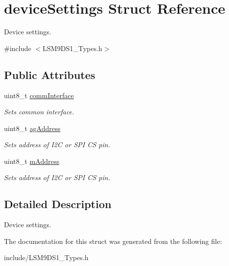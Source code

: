 \hypertarget{structdeviceSettings}{}\section{device\+Settings Struct Reference}
\label{structdeviceSettings}


Device settings.  




{\ttfamily \#include $<$L\+S\+M9\+D\+S1\+\_\+\+Types.\+h$>$}

\subsection*{Public Attributes}
\begin{DoxyCompactItemize}
\item 
\mbox{\label{structdeviceSettings_a6512c63d06cce5f99760b1b3a6a4dfe9}} 
uint8\+\_\+t \hyperlink{structdeviceSettings_a6512c63d06cce5f99760b1b3a6a4dfe9}{comm\+Interface}
\begin{DoxyCompactList}\small\item\em Sets common interface. \end{DoxyCompactList}\item 
\mbox{\label{structdeviceSettings_a2f43ac785e01fcbcfaf8436885f638ab}} 
uint8\+\_\+t \hyperlink{structdeviceSettings_a2f43ac785e01fcbcfaf8436885f638ab}{ag\+Address}
\begin{DoxyCompactList}\small\item\em Sets address of I2C or S\+PI CS pin. \end{DoxyCompactList}\item 
\mbox{\label{structdeviceSettings_aec4e1d3e3f38b4e3e0f74f1640e16faa}} 
uint8\+\_\+t \hyperlink{structdeviceSettings_aec4e1d3e3f38b4e3e0f74f1640e16faa}{m\+Address}
\begin{DoxyCompactList}\small\item\em Sets address of I2C or S\+PI CS pin. \end{DoxyCompactList}\end{DoxyCompactItemize}


\subsection{Detailed Description}
Device settings. 

The documentation for this struct was generated from the following file\+:\begin{DoxyCompactItemize}
\item 
include/L\+S\+M9\+D\+S1\+\_\+\+Types.\+h\end{DoxyCompactItemize}

